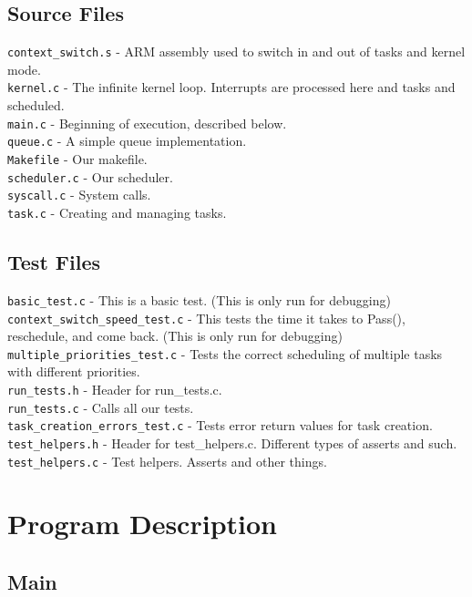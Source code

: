 \documentclass[letterpaper]{article}
\begin{document}
\subsection{Source Files}
\verb!context_switch.s! - ARM assembly used to switch in and out of tasks and kernel mode.\\
\verb!kernel.c! - The infinite kernel loop. Interrupts are processed here and tasks and scheduled.\\
\verb!main.c! - Beginning of execution, described below.\\
\verb!queue.c! - A simple queue implementation.\\
\verb!Makefile! - Our makefile.\\
\verb!scheduler.c! - Our scheduler.\\
\verb!syscall.c! - System calls.\\
\verb!task.c! - Creating and managing tasks.\\

\subsection{Test Files}
\verb!basic_test.c! - This is a basic test. (This is only run for debugging)\\
\verb!context_switch_speed_test.c! - This tests the time it takes to Pass(), reschedule, and come back. (This is only run for debugging)\\
\verb!multiple_priorities_test.c! - Tests the correct scheduling of multiple tasks with different priorities.\\
\verb!run_tests.h! - Header for run\_tests.c.\\
\verb!run_tests.c! - Calls all our tests.\\
\verb!task_creation_errors_test.c! - Tests error return values for task creation.\\
\verb!test_helpers.h! - Header for test\_helpers.c. Different types of asserts and such.\\
\verb!test_helpers.c! - Test helpers. Asserts and other things.

\section{Program Description}

\subsection{Main}
\end{document}
